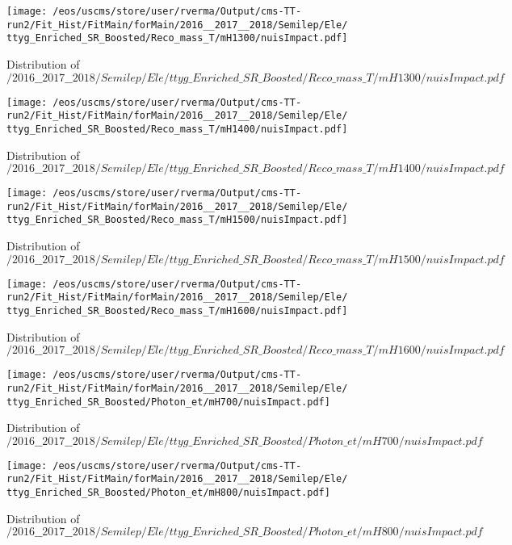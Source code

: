 \begin{figure}
\centering
\texttt{[image: /eos/uscms/store/user/rverma/Output/cms-TT-run2/Fit\_Hist/FitMain/forMain/2016\_\_2017\_\_2018/Semilep/Ele/ttyg\_Enriched\_SR\_Boosted/Reco\_mass\_T/mH1300/nuisImpact.pdf]}
\caption{Distribution of $/2016\_\_2017\_\_2018/Semilep/Ele/ttyg\_Enriched\_SR\_Boosted/Reco\_mass\_T/mH1300/nuisImpact.pdf$}
\end{figure}

\begin{figure}
\centering
\texttt{[image: /eos/uscms/store/user/rverma/Output/cms-TT-run2/Fit\_Hist/FitMain/forMain/2016\_\_2017\_\_2018/Semilep/Ele/ttyg\_Enriched\_SR\_Boosted/Reco\_mass\_T/mH1400/nuisImpact.pdf]}
\caption{Distribution of $/2016\_\_2017\_\_2018/Semilep/Ele/ttyg\_Enriched\_SR\_Boosted/Reco\_mass\_T/mH1400/nuisImpact.pdf$}
\end{figure}

\begin{figure}
\centering
\texttt{[image: /eos/uscms/store/user/rverma/Output/cms-TT-run2/Fit\_Hist/FitMain/forMain/2016\_\_2017\_\_2018/Semilep/Ele/ttyg\_Enriched\_SR\_Boosted/Reco\_mass\_T/mH1500/nuisImpact.pdf]}
\caption{Distribution of $/2016\_\_2017\_\_2018/Semilep/Ele/ttyg\_Enriched\_SR\_Boosted/Reco\_mass\_T/mH1500/nuisImpact.pdf$}
\end{figure}

\begin{figure}
\centering
\texttt{[image: /eos/uscms/store/user/rverma/Output/cms-TT-run2/Fit\_Hist/FitMain/forMain/2016\_\_2017\_\_2018/Semilep/Ele/ttyg\_Enriched\_SR\_Boosted/Reco\_mass\_T/mH1600/nuisImpact.pdf]}
\caption{Distribution of $/2016\_\_2017\_\_2018/Semilep/Ele/ttyg\_Enriched\_SR\_Boosted/Reco\_mass\_T/mH1600/nuisImpact.pdf$}
\end{figure}

\begin{figure}
\centering
\texttt{[image: /eos/uscms/store/user/rverma/Output/cms-TT-run2/Fit\_Hist/FitMain/forMain/2016\_\_2017\_\_2018/Semilep/Ele/ttyg\_Enriched\_SR\_Boosted/Photon\_et/mH700/nuisImpact.pdf]}
\caption{Distribution of $/2016\_\_2017\_\_2018/Semilep/Ele/ttyg\_Enriched\_SR\_Boosted/Photon\_et/mH700/nuisImpact.pdf$}
\end{figure}

\begin{figure}
\centering
\texttt{[image: /eos/uscms/store/user/rverma/Output/cms-TT-run2/Fit\_Hist/FitMain/forMain/2016\_\_2017\_\_2018/Semilep/Ele/ttyg\_Enriched\_SR\_Boosted/Photon\_et/mH800/nuisImpact.pdf]}
\caption{Distribution of $/2016\_\_2017\_\_2018/Semilep/Ele/ttyg\_Enriched\_SR\_Boosted/Photon\_et/mH800/nuisImpact.pdf$}
\end{figure}


